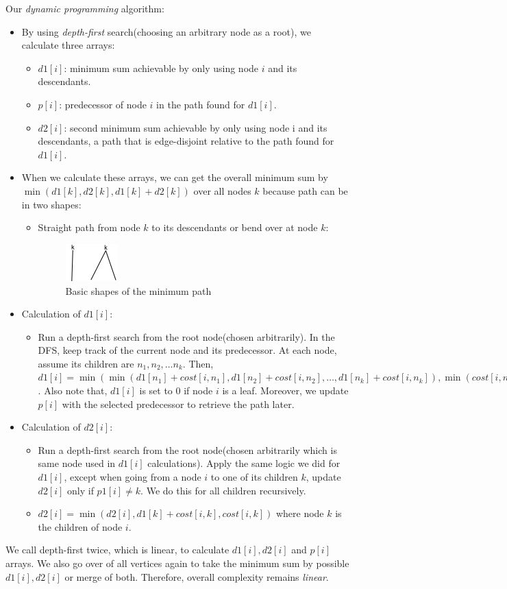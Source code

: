 Our \textit{dynamic programming} algorithm:
\begin{itemize}
  \item By using \textit{depth-first} search(choosing an arbitrary node as a root), we calculate three arrays:
  \begin{itemize}
    \item $d1[i]$: minimum sum achievable by only using node $i$ and its descendants.
    \item $p[i]$: predecessor of node $i$ in the path found for $d1[i]$.
    \item $d2[i]$: second minimum sum achievable by only using node i and its descendants, a path that is edge-disjoint relative to the path found for $d1[i]$. 
  \end{itemize}
  \item When we calculate these arrays, we can get the overall minimum sum by\\ $\min(d1[k], d2[k], d1[k] + d2[k])$ over all nodes $k$ because path can be in two shapes:
  \begin{itemize}
    \item Straight path from node $k$ to its descendants or bend over at node $k$:
       \begin{figure}[ht]
        \centering
        \includegraphics[width=0.2\textwidth]{q2}
        \caption{Basic shapes of the minimum path}
    \end{figure}
  \end{itemize}
  \item Calculation of $d1[i]$:
  \begin{itemize}
    \item Run a depth-first search from the root node(chosen arbitrarily). In the DFS, keep track of the current node and its predecessor. At each node, assume its children are $n_1, n_2, \dots n_k$. Then, $d1[i] = \min(\min(d1[n_1] + cost[i, n_1], d1[n_2] + cost[i, n_2], \dots, d1[n_k] + cost[i, n_k]), \min(cost[i, n_k]))$. Also note that, $d1[i]$ is set to 0 if node $i$ is a leaf. Moreover, we update $p[i]$ with the selected predecessor to retrieve the path later.
  \end{itemize}
  \item Calculation of $d2[i]$:
  \begin{itemize}
    \item Run a depth-first search from the root node(chosen arbitrarily which is same node used in $d1[i]$ calculations). Apply the same logic we did for $d1[i]$, except when going from a node $i$ to one of its children $k$, update $d2[i]$ only if $p1[i] \neq k$. We do this for all children recursively.
    \item $d2[i] = \min(d2[i], d1[k] + cost[i, k], cost[i, k])$ where node $k$ is the children of node $i$.
  \end{itemize}
\end{itemize}

We call depth-first twice, which is linear, to calculate $d1[i], d2[i]$ and $p[i]$ arrays. We also go over of all vertices again to take the minimum sum by possible $d1[i], d2[i]$ or merge of both. Therefore, overall complexity remains \textit{linear}.